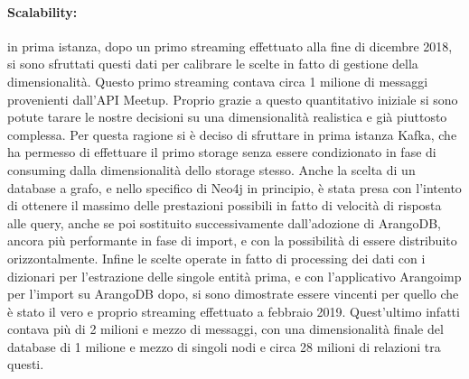 \documentclass[fleqn,10pt]{SelfArx} %
\begin{document}
{{\paragraph{Scalability:} in prima istanza, dopo un primo streaming effettuato alla fine di dicembre 2018, si sono sfruttati questi dati per calibrare le scelte in fatto di gestione della dimensionalità. 
Questo primo streaming contava circa 1 milione di messaggi provenienti dall'API Meetup. 
Proprio grazie a questo quantitativo iniziale si sono potute tarare le nostre decisioni su una dimensionalità realistica e già piuttosto complessa. 
Per questa ragione si è deciso di sfruttare in prima istanza Kafka, che ha permesso di effettuare il primo storage senza essere condizionato in fase di consuming dalla dimensionalità dello storage stesso. 
Anche la scelta di un database a grafo, e nello specifico di Neo4j in principio, è stata presa con l'intento di ottenere il massimo delle prestazioni possibili in fatto di velocità di risposta alle query, anche se poi sostituito successivamente dall'adozione di ArangoDB, ancora più performante in fase di import, e con la possibilità di essere distribuito orizzontalmente. 
Infine le scelte operate in fatto di processing dei dati con i dizionari per l'estrazione delle singole entità prima, e con l'applicativo Arangoimp per l'import su ArangoDB dopo, si sono dimostrate essere vincenti per quello che è stato il vero e proprio streaming effettuato a febbraio 2019.
Quest'ultimo infatti contava più di 2 milioni e mezzo di messaggi, con una dimensionalità finale del database di 1 milione e mezzo di singoli nodi e circa 28 milioni di relazioni tra questi.
}}
\end{document}
